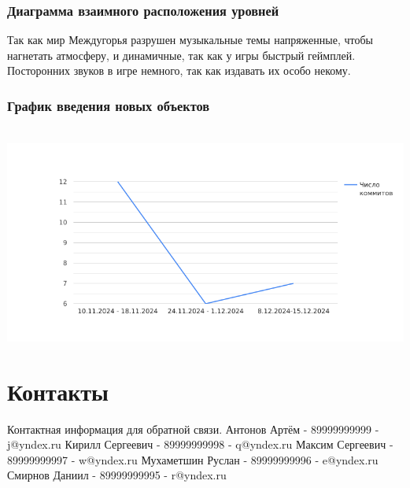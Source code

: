 \documentclass{article}
\begin{document}
\subsubsection{Диаграмма взаимного расположения уровней}
Так как мир Междугорья разрушен музыкальные темы напряженные, чтобы нагнетать атмосферу, и динамичные, так как у игры быстрый геймплей. Посторонних звуков в игре немного, так как издавать их особо некому.

\subsubsection{График введения новых объектов}
\\
\includegraphics[width=0.3\linewidth]{images/chart.png}\\

\newpage

\section{Контакты}
Контактная информация для обратной связи. \newline
Антонов Артём - 89999999999 - j@yndex.ru\newline
Кирилл Сергеевич - 89999999998 - q@yndex.ru\newline
Максим Сергеевич - 89999999997 - w@yndex.ru\newline
Мухаметшин Руслан - 89999999996 - e@yndex.ru\newline
Смирнов Даниил - 89999999995 - r@yndex.ru
\end{document}
